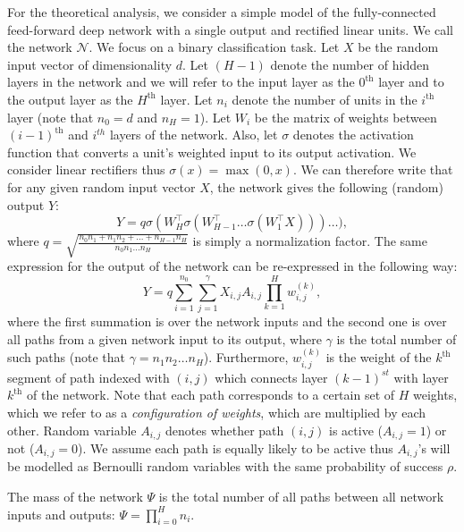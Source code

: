 \documentclass[twoside]{article}
\begin{document}
For the theoretical analysis, we consider a simple model of the fully-connected feed-forward deep network with a single output and rectified linear units. We call the network $\mathcal{N}$. We focus on a binary classification task. Let $X$ be the random input vector of dimensionality $d$. Let $(H-1)$ denote the number of hidden layers in the network and we will refer to the input layer as the $0^{\text{th}}$ layer and to the output layer as the $H^{\text{th}}$ layer. Let $n_i$ denote the number of units in the $i^{\text{th}}$ layer (note that $n_0 = d$ and $n_H = 1$). Let $W_i$ be the matrix of weights between $(i - 1)^{\text{th}}$ and $i^{th}$ layers of the network. Also, let $\sigma$ denotes the activation function that converts a unit's weighted input to its output activation. We consider linear rectifiers thus $\sigma(x) = \max(0,x)$. We can therefore write that for any given random input vector $X$, the network gives the following (random) output $Y$:
\[Y = q\sigma(W_H^{\top}\sigma(W_{H-1}^{\top}\dots\sigma(W_1^{\top}X)))\dots),
\]
where $q = \sqrt{\frac{n_0n_1 + n_1n_2 + ... + n_{H-1}n_H}{n_0n_1...n_H}}$ is simply a normalization factor. The same expression for the output of the network can be re-expressed in the following way:
\begin{equation}
Y = q\sum_{i=1}^{n_0}\sum_{j = 1}^\gamma X_{i,j}A_{i,j}\prod_{k = 1}^{H}w_{i,j}^{(k)},
\label{eq:befrein}
\end{equation}
where the first summation is over the network inputs and the second one is over all paths from a given network input to its output, where $\gamma$ is the total number of such paths (note that $\gamma = n_1n_2\dots n_H$). Furthermore, $w_{i,j}^{(k)}$ is the weight of the $k^{\text{th}}$ segment of path indexed with $(i,j)$ which connects layer $(k-1)^{st}$ with layer $k^{\text{th}}$ of the network. Note that each path corresponds to a certain set of $H$ weights, which we refer to as a \textit{configuration of weights}, which are multiplied by each other. Random variable $A_{i,j}$ denotes whether path $(i,j)$ is active ($A_{i,j} = 1$) or not ($A_{i,j} = 0$).  We assume each path is equally likely to be active thus $A_{i,j}$'s will be modelled as Bernoulli random variables with the same probability of success $\rho$. 

\begin{definition}
The mass of the network $\Psi$ is the total number of all paths between all network inputs and outputs: $\Psi = \prod_{i=0}^Hn_i$.
\end{definition}
\end{document}
